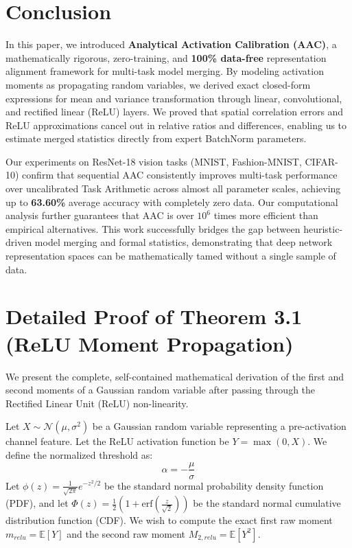 \documentclass{article}
\theoremstyle{plain}
\theoremstyle{definition}
\theoremstyle{remark}
\begin{document}
\section{Conclusion}
\label{sec:conclusion}

In this paper, we introduced \textbf{Analytical Activation Calibration (AAC)}, a mathematically rigorous, zero-training, and \textbf{100\% data-free} representation alignment framework for multi-task model merging. By modeling activation moments as propagating random variables, we derived exact closed-form expressions for mean and variance transformation through linear, convolutional, and rectified linear (ReLU) layers. We proved that spatial correlation errors and ReLU approximations cancel out in relative ratios and differences, enabling us to estimate merged statistics directly from expert BatchNorm parameters. 

Our experiments on ResNet-18 vision tasks (MNIST, Fashion-MNIST, CIFAR-10) confirm that sequential AAC consistently improves multi-task performance over uncalibrated Task Arithmetic across almost all parameter scales, achieving up to \textbf{63.60\%} average accuracy with completely zero data. Our computational analysis further guarantees that AAC is over $10^6$ times more efficient than empirical alternatives. This work successfully bridges the gap between heuristic-driven model merging and formal statistics, demonstrating that deep network representation spaces can be mathematically tamed without a single sample of data.




\newpage
\appendix
\onecolumn

\section{Detailed Proof of Theorem 3.1 (ReLU Moment Propagation)}
\label{app:proof_relu}

We present the complete, self-contained mathematical derivation of the first and second moments of a Gaussian random variable after passing through the Rectified Linear Unit (ReLU) non-linearity. 

Let $X \sim \mathcal{N}(\mu, \sigma^2)$ be a Gaussian random variable representing a pre-activation channel feature. Let the ReLU activation function be $Y = \max(0, X)$. We define the normalized threshold as:
\begin{equation}
    \alpha = -\frac{\mu}{\sigma}
\end{equation}
Let $\phi(z) = \frac{1}{\sqrt{2\pi}}e^{-z^2/2}$ be the standard normal probability density function (PDF), and let $\Phi(z) = \frac{1}{2}\left(1 + \text{erf}\left(\frac{z}{\sqrt{2}}\right)\right)$ be the standard normal cumulative distribution function (CDF). We wish to compute the exact first raw moment $m_{relu} = \mathbb{E}[Y]$ and the second raw moment $M_{2, relu} = \mathbb{E}[Y^2]$.
\end{document}
